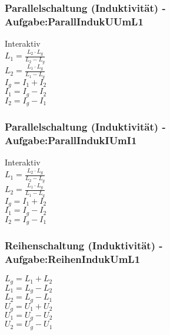 \subsubsection{Parallelschaltung (Induktivität) - Aufgabe:ParallIndukUUmL1} 
\begin{minipage}{0.45\textwidth} 
Interaktiv\\ 
$ L_{1}  = \frac{L_{2} \cdot L_{g} }{L_{2} -L_{g} } $\\ 
$ L_{2}  = \frac{L_{1} \cdot L_{g} }{L_{1} -L_{g} } $\\ 
$ I_{g}  = I_{1}  + I_{2} $\\ 
$ I_{1}  = I_{g}  - I_{2} $\\ 
$ I_{2}  = I_{g}  - I_{1} $\\ 
\end{minipage} 
\begin{minipage}{0.45\textwidth} 
 
\end{minipage} 
\subsubsection{Parallelschaltung (Induktivität) - Aufgabe:ParallIndukIUmI1} 
\begin{minipage}{0.45\textwidth} 
Interaktiv\\ 
$ L_{1}  = \frac{L_{2} \cdot L_{g} }{L_{2} -L_{g} } $\\ 
$ L_{2}  = \frac{L_{1} \cdot L_{g} }{L_{1} -L_{g} } $\\ 
$ I_{g}  = I_{1}  + I_{2} $\\ 
$ I_{1}  = I_{g}  - I_{2} $\\ 
$ I_{2}  = I_{g}  - I_{1} $\\ 
\end{minipage} 
\begin{minipage}{0.45\textwidth} 
 
\end{minipage} 
\subsubsection{Reihenschaltung (Induktivität) - Aufgabe:ReihenIndukUmL1} 
\begin{minipage}{0.45\textwidth} 
$ L_{g}  = L_{1}  + L_{2} $\\ 
$ L_{1}  = L_{g}  - L_{2} $\\ 
$ L_{2}  = L_{g}  - L_{1} $\\ 
$ U_{g}  = U_{1}  + U_{2} $\\ 
$ U_{1}  = U_{g}  - U_{2} $\\ 
$ U_{2}  = U_{g}  - U_{1} $\\ 
\end{minipage} 
\begin{minipage}{0.45\textwidth} 
 
\end{minipage} 
